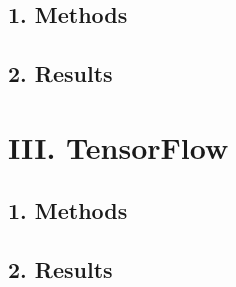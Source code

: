 \subsection*{\large 1. Methods}

\subsection*{\large 2. Results}

\newpage
\section*{\Large III. TensorFlow}

\subsection*{\large 1. Methods}

\subsection*{\large 2. Results}




\clearpage

%
%
%



